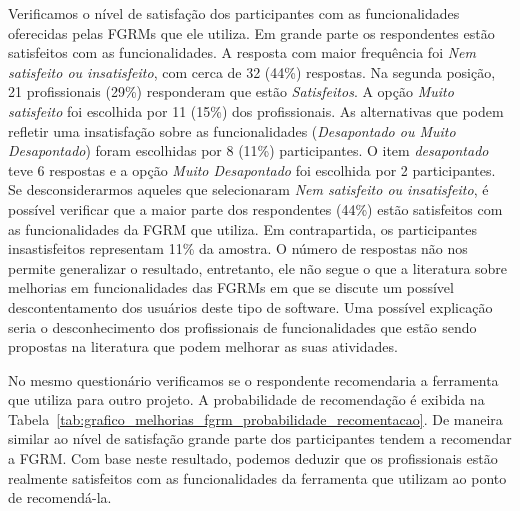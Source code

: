 Verificamos o nível de satisfação dos participantes com as funcionalidades
oferecidas pelas FGRMs que ele utiliza. Em grande parte os respondentes estão
satisfeitos com as funcionalidades. A resposta com maior frequência foi
\textit{Nem satisfeito ou insatisfeito}, com cerca de 32 (44\%) respostas. Na
segunda posição, 21 profissionais (29\%) responderam que estão
\textit{Satisfeitos}. A opção \textit{Muito satisfeito} foi escolhida por 11
(15\%) dos profissionais. As alternativas que podem refletir uma insatisfação
sobre as funcionalidades (\textit{Desapontado ou Muito Desapontado}) foram
escolhidas por 8 (11\%) participantes. O item \textit{desapontado} teve 6
respostas e a opção \textit{Muito Desapontado} foi escolhida por 2
participantes. Se desconsiderarmos aqueles que selecionaram \textit{Nem
    satisfeito ou insatisfeito}, é possível verificar que a maior parte dos
respondentes (44\%) estão satisfeitos com as funcionalidades da FGRM que
utiliza. Em contrapartida, os participantes insastisfeitos representam 11\% da
amostra. O número de respostas não nos permite generalizar o resultado,
entretanto, ele não segue o que a literatura sobre melhorias em funcionalidades
das FGRMs em que se discute um possível descontentamento dos usuários deste
tipo de software. Uma possível explicação seria o desconhecimento dos
profissionais de funcionalidades que estão sendo propostas na literatura que
podem melhorar as suas atividades.

No mesmo questionário verificamos se o respondente recomendaria a ferramenta
que utiliza para outro projeto. A probabilidade de recomendação é exibida na
Tabela~\ref{tab:grafico_melhorias_fgrm_probabilidade_recomentacao}. De maneira
similar ao nível de satisfação grande parte dos participantes tendem a
recomendar a FGRM\@. Com base neste resultado, podemos deduzir que os
profissionais estão realmente satisfeitos com as funcionalidades da ferramenta
que utilizam ao ponto de recomendá-la.

\begin{table}[htpb]
\centering
{}
\caption{Probabilidade de Recomendação da Ferramenta Utilizada}\label{tab:grafico_melhorias_fgrm_probabilidade_recomentacao}
\end{table}

